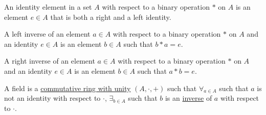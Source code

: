             \begin{definition}
                \label{%
                    Definition:MathEnc:Analysis:%
                    Sum:IdentityElement%
                }
                An identity element in a set $A$ with
                respect to a binary operation $*$
                on $A$ is an element $e\in A$ that is
                both a right and a left identity.
            \end{definition}
            \begin{definition}
                \label{Definition:MathEnc:Analysis:Sum:LeftInverse}
                A left inverse of an element $a\in A$ with
                respect to a binary operation $*$
                on $A$ and an identity $e\in A$ is an element
                $b\in A$ such that $b*a=e$.
            \end{definition}
            \begin{definition}
                \label{Definition:MathEnc:Analysis:Sum:RightInverse}
                A right inverse of an element $a\in A$ with
                respect to a binary operation $*$
                on $A$ and an identity $e\in A$ is an element
                $b\in A$ such that $a*b=e$.
            \end{definition}
            \begin{definition}
                \label{Definition:MathEnc:Analysis:Sum:Field}
                A field is a 
                \hyperref[%
                    Definition:MathEnc:%
                    Analysis:Sum:ComRingUnit%
                ]{commutative ring with unity}
                $(A,\cdot,+)$ such that $\forall_{a\in A}$
                such that $a$ is not an identity with respect
                to $\cdot$, $\exists_{b\in A}$ such that $b$ is an
                \hyperref[%
                    Definition:MathEnc:Analysis:%
                    Sum:Inverse%
                ]{inverse} of $a$ with respect to $\cdot$.
            \end{definition}
